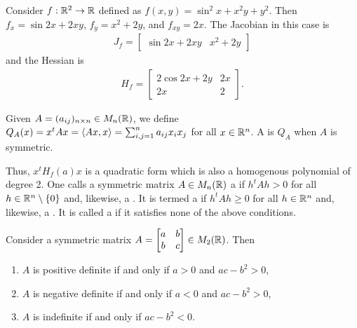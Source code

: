 \begin{example}
    Consider $f:\mathbb{R}^{2} \to \mathbb{R}$ defined as $f(x,y) = \sin^{2}x + x^{2}y + y^{2}$. Then $f_{x} = \sin 2x + 2xy$, $f_{y} = x^{2}+2y$, and $f_{xy} = 2x$. The Jacobian in this case is
    \begin{align}
        J_{f} = \begin{bmatrix}
            \sin 2x + 2xy & x^{2}+2y
        \end{bmatrix}
    \end{align}
    and the Hessian is
    \begin{align}
        H_{f} = \begin{bmatrix}
            2 \cos 2x + 2y & 2x \\ 2x & 2
        \end{bmatrix}.
    \end{align}
\end{example}

\begin{definition}
    Given $A = (a_{ij})_{n \times n} \in M_{n}(\mathbb{R})$, we define $Q_{A}(x) = x^{t}Ax = \langle Ax,x\rangle = \sum_{i,j =1}^{n} a_{ij}x_{i}x_{j}$ for all $x \in \mathbb{R}^{n}$. A  is $Q_{A}$ when $A$ is symmetric.
\end{definition}

Thus, $x^{t}H_{f}(a)x$ is a quadratic form which is also a homogenous polynomial of degree 2. One calls a symmetric matrix $A \in M_{n}(\mathbb{R})$ a  if $h^{t}Ah > 0$ for all $h \in \mathbb{R}^{n} \setminus \{0\}$ and, likewise, a . It is termed a  if $h^{t}Ah \geq 0$ for all $h \in \mathbb{R}^{n}$ and, likewise, a . It is called a  if it satisfies none of the above conditions.

\begin{theorem}
    Consider a symmetric matrix $A = \begin{bmatrix}
        a & b \\ b & c
    \end{bmatrix} \in M_{2}(\mathbb{R})$. Then
    \begin{enumerate}
        \item $A$ is positive definite if and only if $a > 0$ and $ac - b^{2} > 0$,
        \item $A$ is negative definite if and only if $a < 0$ and $ac - b^{2} > 0$,
        \item $A$ is indefinite if and only if $ac - b^{2} < 0$.
    \end{enumerate}
\end{theorem}

